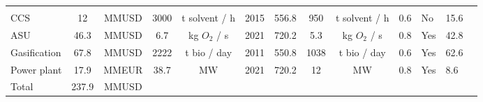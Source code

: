 \documentclass[a4paper, titlepage]{article}
\begin{document}
\begin{table}
\begin{tabular}{|| C{2.3cm} | c | c | c | c | C{1.4cm} | C{1.2cm} | c | c | C{0.9cm} | C{1.4cm} | C{1.5cm} | C{0.9cm} ||}
        \cite{cloeteCosteffectiveCleanAmmonia2021}                                                                                                                                                                                                       \\
        CCS              & 12                                                  & MMUSD                                    & 3000                                   & t solvent / h   & 2015     & 556.8 & 950    & t solvent / h   & 0.6  & No  & 15.6 &
        \cite{imEconomicAssessmentOptimization2015}                                                                                                                                                                                                      \\
        ASU              & 46.3                                                & MMUSD                                    & 6.7                                    & kg $O_2$ / s    & 2021     & 720.2 & 5.3    & kg $O_2$ / s    & 0.8  & Yes & 42.8 &
        \cite{cloeteCosteffectiveCleanAmmonia2021}                                                                                                                                                                                                       \\
        Gasification     & 67.8                                                & MMUSD                                    & 2222                                   & t bio / day     & 2011     & 550.8 & 1038   & t bio / day     & 0.6  & Yes & 62.6 &
        \cite{swansonTechnoeconomicAnalysisBiomasstoliquids2010}                                                                                                                                                                                         \\
        Power plant      & 17.9                                                & MMEUR                                    & 38.7                                   & MW              & 2021     & 720.2 & 12     & MW              & 0.8  & Yes & 8.6  &
        \cite{cloeteCosteffectiveCleanAmmonia2021}                                                                                                                                                                                                       \\
        \hline
        Total            & 237.9                                               & MMUSD                                    &                                        &                 &          &       &        &                 &      &     &      & \\

\end{tabular}
\end{table}
\end{document}
